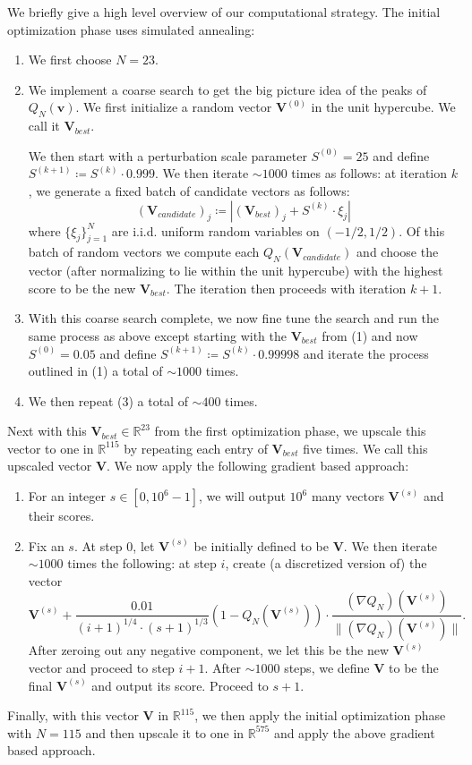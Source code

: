 \documentclass[reqno, 11pt]{amsart}
\newcommand{\R}[0]{\mathbb{R}}
\newcommand{\mb}[1]{\mathbf{#1}}
\theoremstyle{remark}
\begin{document}
We briefly give a high level overview of our computational strategy.
The initial optimization phase uses simulated annealing:
\begin{enumerate}
\item We first choose $N = 23$.
\item We implement a coarse search to get the big picture
idea of the peaks of $Q_{N}(\mb{v})$.
We first initialize a random vector $\mb{V}^{(0)}$ in the unit
hypercube. We call it $\mb{V}_{best}$.

We then start with a perturbation scale parameter $S^{(0)} = 25$
and define $S^{(k+1)} \coloneqq S^{(k)} \cdot 0.999$.
We then iterate $\sim 1000$ times as follows: at iteration $k$,
we generate a fixed batch of candidate vectors as follows:
$$(\mb{V}_{candidate})_{j} \coloneqq |(\mb{V}_{best})_{j} + S^{(k)} \cdot \xi_{j}|$$
where $\{\xi_{j}\}_{j = 1}^{N}$ are i.i.d. uniform random variables on $(-1/2, 1/2)$. Of this batch of random vectors we compute
each $Q_{N}(\mb{V}_{candidate})$ and choose the vector (after normalizing
to lie within the unit hypercube) with the highest score to be the
new $\mb{V}_{best}$. The iteration then proceeds with iteration $k + 1$.

\item With this coarse search complete, we now fine tune the search
and run the same process as above except starting with the 
$\mb{V}_{best}$ from (1) and now $S^{(0)} = 0.05$ and define
$S^{(k + 1)} \coloneqq S^{(k)} \cdot 0.99998$ and iterate the process
outlined in (1) a total of $\sim 1000$ times.

\item We then repeat (3) a total of $\sim 400$ times.
\end{enumerate}

Next with this $\mb{V}_{best} \in \R^{23}$ from the first optimization
phase, we upscale this vector to one in $\R^{115}$ by 
repeating each entry of $\mb{V}_{best}$ five times. 
We call this upscaled vector $\mb{V}$.
We now apply the following gradient based approach:
\begin{enumerate}
\item For an integer $s \in [0, 10^{6} - 1]$, we will output
$10^6$ many vectors $\mb{V}^{(s)}$ and their scores.
\item Fix an $s$. At step $0$, let $\mb{V}^{(s)}$ be initially defined to be $\mb{V}$. We then iterate $\sim 1000$ times the following: at step $i$,
create (a discretized version of) the vector
$$\mb{V}^{(s)} + \frac{0.01}{(i + 1)^{1/4} \cdot (s + 1)^{1/3}}(1 - Q_{N}(\mb{V}^{(s)}))\cdot \frac{(\nabla Q_N)(\mb{V}^{(s)})}{\|(\nabla Q_N)(\mb{V}^{(s)})\|}.$$
After zeroing out any negative component, we let this be the
new $\mb{V}^{(s)}$ vector and proceed to step $i + 1$.
After $\sim 1000$ steps, we define $\mb{V}$ to be the final $\mathbf{V}^{(s)}$ and output its score.
Proceed to $s + 1$.
\end{enumerate}
Finally, with this vector $\mathbf{V}$ in $\R^{115}$, we then apply the initial optimization
phase with $N = 115$ and then upscale it to one in $\R^{575}$ and apply the above gradient
based approach.
\end{document}
